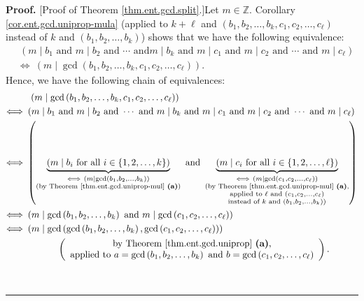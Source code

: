 \documentclass[numbers=enddot,12pt,final,onecolumn,notitlepage]{scrartcl}%
\numberwithin{exer}{subsection}
\theoremstyle{definition}
\newenvironment{proof}[1][Proof]{\noindent\textbf{#1.} }{\ \rule{0.5em}{0.5em}}
\begin{document}
\begin{proof}
[Proof of Theorem \ref{thm.ent.gcd.split}.]Let $m\in\mathbb{Z}$. Corollary
\ref{cor.ent.gcd.uniprop-mula} (applied to $k+\ell$ and \newline$\left(
b_{1},b_{2},\ldots,b_{k},c_{1},c_{2},\ldots,c_{\ell}\right)  $ instead of $k$
and $\left(  b_{1},b_{2},\ldots,b_{k}\right)  $) shows that we have the
following equivalence:%
\begin{align*}
&  \ \left(  m\mid b_{1}\text{ and }m\mid b_{2}\text{ and }\cdots\text{ and
}m\mid b_{k}\text{ and }m\mid c_{1}\text{ and }m\mid c_{2}\text{ and }%
\cdots\text{ and }m\mid c_{\ell}\right) \\
&  \Longleftrightarrow\ \left(  m\mid\gcd\left(  b_{1},b_{2},\ldots
,b_{k},c_{1},c_{2},\ldots,c_{\ell}\right)  \right)  .
\end{align*}
Hence, we have the following chain of equivalences:%
\begin{align*}
&  \ \left(  m\mid\gcd\left(  b_{1},b_{2},\ldots,b_{k},c_{1},c_{2}%
,\ldots,c_{\ell}\right)  \right) \\
\Longleftrightarrow\  &  \left(  m\mid b_{1}\text{ and }m\mid b_{2}\text{ and
}\cdots\text{ and }m\mid b_{k}\text{ and }m\mid c_{1}\text{ and }m\mid
c_{2}\text{ and }\cdots\text{ and }m\mid c_{\ell}\right) \\
\Longleftrightarrow\  &  \left(  \underbrace{\left(  m\mid b_{i}\text{ for all
}i\in\left\{  1,2,\ldots,k\right\}  \right)  }_{\substack{\Longleftrightarrow
\ \left(  m\mid\gcd\left(  b_{1},b_{2},\ldots,b_{k}\right)  \right)
\\\text{(by Theorem \ref{thm.ent.gcd.uniprop-mul} \textbf{(a)})}}}\text{ and
}\underbrace{\left(  m\mid c_{i}\text{ for all }i\in\left\{  1,2,\ldots
,\ell\right\}  \right)  }_{\substack{\Longleftrightarrow\ \left(  m\mid
\gcd\left(  c_{1},c_{2},\ldots,c_{\ell}\right)  \right)  \\\text{(by Theorem
\ref{thm.ent.gcd.uniprop-mul} \textbf{(a)},}\\\text{applied to }\ell\text{ and
}\left(  c_{1},c_{2},\ldots,c_{\ell}\right)  \\\text{instead of }k\text{ and
}\left(  b_{1},b_{2},\ldots,b_{k}\right)  \text{)}}}\right) \\
\Longleftrightarrow\  &  \left(  m\mid\gcd\left(  b_{1},b_{2},\ldots
,b_{k}\right)  \text{ and }m\mid\gcd\left(  c_{1},c_{2},\ldots,c_{\ell
}\right)  \right) \\
\Longleftrightarrow\  &  \left(  m\mid\gcd\left(  \gcd\left(  b_{1}%
,b_{2},\ldots,b_{k}\right)  ,\gcd\left(  c_{1},c_{2},\ldots,c_{\ell}\right)
\right)  \right) \\
&  \ \ \ \ \ \ \ \ \ \ \left(
\begin{array}
[c]{c}%
\text{by Theorem \ref{thm.ent.gcd.uniprop} \textbf{(a)},}\\
\text{applied to }a=\gcd\left(  b_{1},b_{2},\ldots,b_{k}\right)  \text{ and
}b=\gcd\left(  c_{1},c_{2},\ldots,c_{\ell}\right)
\end{array}
\right)  .
\end{align*}



\end{proof}
\end{document}
